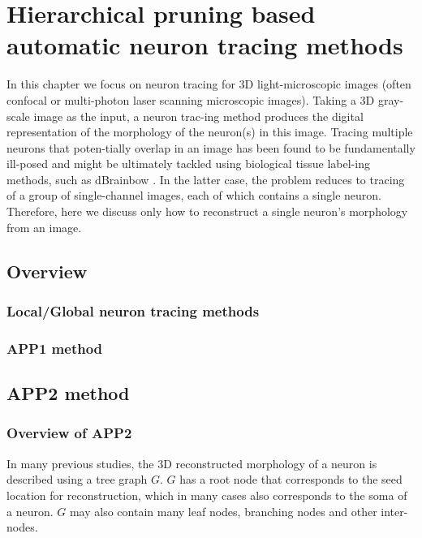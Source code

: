\chapter{Hierarchical pruning based automatic neuron tracing methods} \label{chpt:auto-nt}
In this chapter we focus on neuron tracing for 3D light-microscopic images (often confocal or multi-photon laser scanning microscopic images). Taking a 3D gray-scale image as the input, a neuron trac-ing method produces the digital representation of the morphology of the neuron(s) in this image. Tracing multiple neurons that poten-tially overlap in an image has been found to be fundamentally ill-posed and might be ultimately tackled using biological tissue label-ing methods, such as dBrainbow \cite{hampel2011drosophila}. In the latter case, the problem reduces to tracing of a group of single-channel images, each of which contains a single neuron. Therefore, here we discuss only how to reconstruct a single neuron’s morphology from an image. 
\section{Overview}
\subsection{Local/Global neuron tracing methods}
\subsection{APP1 method}
\section{APP2 method}
\subsection{Overview of APP2}
In many previous studies, the 3D reconstructed morphology of a neuron is described using a tree graph $G$.  $G$ has a root node that corresponds to the seed location for reconstruction, which in many cases also corresponds to the soma of a neuron. $G$ may also contain many leaf nodes, branching nodes and other inter-nodes.

